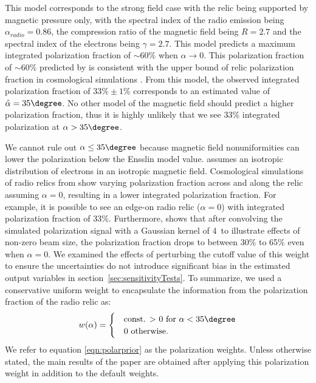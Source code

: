 This model corresponds to the strong field case with the relic being supported by
magnetic pressure only, with the spectral index of the radio
emission being $\alpha_{radio} = 0.86$, the compression ratio of the
magnetic field being
$R=2.7$ and the spectral index of the electrons being $\gamma = 2.7$. 
This model predicts a maximum integrated polarization fraction 
 of
$\sim60\%$ when $\alpha \rightarrow 0$. 
This  polarization fraction of $\sim60\%$ predicted by \citep{E98} is
consistent with the upper bound of relic polarization fraction in cosmological
simulations \citep{S13}. From this model, the
observed integrated polarization fraction of $33\%\pm1\%$ corresponds to an estimated value
of $\hat{\alpha}  = 35\degree$. 
No other model of the magnetic field should predict 
a higher polarization fraction, thus it is highly unlikely that we see 33\%
integrated polarization at $\alpha > 35\degree$.  
\par

We cannot rule out $\alpha \leq 35\degree$ because magnetic field
nonuniformities can lower the polarization below the Ensslin model value.
\cite{E98} assumes an isotropic distribution of electrons in an isotropic magnetic field. Cosmological
simulations of radio relics from \cite{S13} show varying polarization
fraction across and along the relic assuming $\alpha = 0$, resulting in a
lower integrated polarization fraction. For example, it is possible to see 
an edge-on radio relic ($\alpha = 0$) with integrated polarization fraction of 33\%. 
Furthermore, \cite{S13} shows that after convolving the
simulated polarization signal with a Gaussian kernel of 4\arcmin~to
illustrate effects of non-zero beam size, the polarization fraction drops
to between 30\% to 65\% even when $\alpha = 0$. We examined the effects of perturbing
the cutoff value of this weight to ensure the uncertainties do not
introduce significant bias in the estimated output variables in
section~\ref{sec:sensitivityTests}.
To summarize, we used a conservative uniform weight to encapsulate the
information from the polarization fraction of the radio relic as:
\begin{equation}
w(\alpha) = 
	\begin{cases}
	& \text{const. $>$ 0 for  }\alpha < 35 \degree \\ 
	& 0 \text{ otherwise}\label{eqn:polarprior}.
	\end{cases}
\end{equation}
We refer to equation \ref{eqn:polarprior} as the polarization weights. Unless
otherwise stated, the main results of the paper are obtained after applying
this polarization weight in addition to the default weights.

